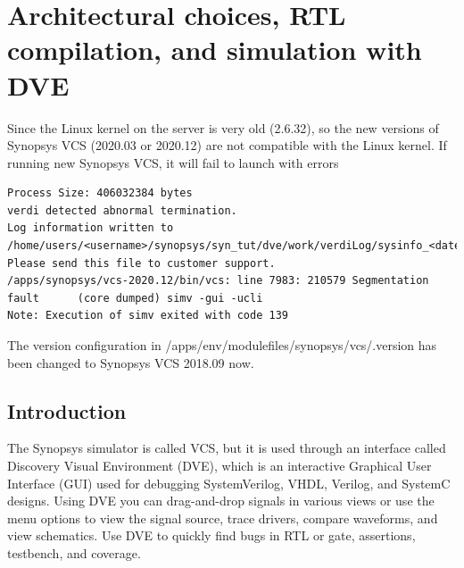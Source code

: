 \documentclass[a4paper,12pt,twoside]{article}
\begin{document}
\newpage
\section{Architectural choices, RTL compilation, and simulation with DVE}
Since the Linux kernel on the server is very old (2.6.32), so the new versions of Synopsys VCS (2020.03 or 2020.12) are not compatible with the Linux kernel. If running new Synopsys VCS, it will fail to launch with errors
\begin{verbatim}
Process Size: 406032384 bytes
verdi detected abnormal termination.
Log information written to
/home/users/<username>/synopsys/syn_tut/dve/work/verdiLog/sysinfo_<date>_<time>.tar.
Please send this file to customer support.
/apps/synopsys/vcs-2020.12/bin/vcs: line 7983: 210579 Segmentation fault      (core dumped) simv -gui -ucli
Note: Execution of simv exited with code 139
\end{verbatim}
The version configuration in /apps/env/modulefiles/synopsys/vcs/.version has been changed to Synopsys VCS 2018.09 now.
\subsection{Introduction}
The Synopsys simulator is called VCS, but it is used through an interface called Discovery Visual Environment (DVE), which is an interactive Graphical User Interface (GUI) used for debugging SystemVerilog, VHDL, Verilog, and SystemC designs. Using DVE you can drag-and-drop signals in various views or use the menu options to view the signal source, trace drivers, compare waveforms, and view schematics. Use DVE to quickly find bugs in RTL or gate, assertions, testbench, and coverage.
\end{document}
